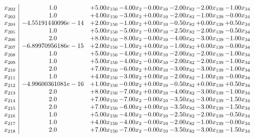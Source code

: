 \documentclass[8pt]{article}
\begin{document}
\[\begin{array}{c| c c@{\hskip 2pt} c@{\hskip 2pt} c@{\hskip 2pt} c@{\hskip 2pt} c@{\hskip 2pt} c@{\hskip 2pt} }
 x_{202}   &  1.0 & +  5.00 x_{150} & -4.00 x_{2} & -0.00 x_{10} & -2.00 x_{82} & -2.00 x_{139} & -1.00 x_{34}\\
 x_{203}   &  1.0 & +  4.00 x_{150} & -3.00 x_{2} & +  0.00 x_{10} & -2.00 x_{82} & -1.00 x_{139} & -0.00 x_{34}\\
 x_{204}   &  -4.55191440096e-14 & +  2.00 x_{150} & -1.00 x_{2} & +  0.00 x_{10} & -0.50 x_{82} & +  0.00 x_{139} & +  0.50 x_{34}\\
 x_{205}   &  1.0 & +  5.00 x_{150} & -5.00 x_{2} & -0.00 x_{10} & -2.50 x_{82} & -2.00 x_{139} & -0.50 x_{34}\\
 x_{206}   &  2.0 & +  8.00 x_{150} & -8.00 x_{2} & -0.00 x_{10} & -4.00 x_{82} & -3.00 x_{139} & -1.00 x_{34}\\
 x_{207}   &  -6.89970956186e-15 & +  2.00 x_{150} & -1.00 x_{2} & +  0.00 x_{10} & -1.00 x_{82} & +  0.00 x_{139} & -0.00 x_{34}\\
 x_{208}   &  1.0 & +  5.00 x_{150} & -4.00 x_{2} & +  0.00 x_{10} & -2.00 x_{82} & -2.00 x_{139} & -1.00 x_{34}\\
 x_{209}   &  1.0 & +  5.00 x_{150} & -4.00 x_{2} & -0.00 x_{10} & -2.00 x_{82} & -2.00 x_{139} & -1.00 x_{34}\\
 x_{210}   &  2.0 & +  7.00 x_{150} & -6.00 x_{2} & +  0.00 x_{10} & -3.00 x_{82} & -3.00 x_{139} & -1.00 x_{34}\\
 x_{211}   &  1.0 & +  4.00 x_{150} & -3.00 x_{2} & +  0.00 x_{10} & -2.00 x_{82} & -1.00 x_{139} & -0.00 x_{34}\\
 x_{212}   &  -4.99600361081e-16 & +  1.00 x_{150} & -0.00 x_{2} & +  0.00 x_{10} & -0.50 x_{82} & +  0.00 x_{139} & +  0.50 x_{34}\\
 x_{213}   &  2.0 & +  8.00 x_{150} & -7.00 x_{2} & +  0.00 x_{10} & -4.00 x_{82} & -3.00 x_{139} & -1.00 x_{34}\\
 x_{214}   &  2.0 & +  7.00 x_{150} & -7.00 x_{2} & -0.00 x_{10} & -3.50 x_{82} & -3.00 x_{139} & -1.50 x_{34}\\
 x_{215}   &  2.0 & +  7.00 x_{150} & -6.00 x_{2} & +  0.00 x_{10} & -3.50 x_{82} & -3.00 x_{139} & -1.50 x_{34}\\
 x_{216}   &  1.0 & +  5.00 x_{150} & -4.00 x_{2} & -0.00 x_{10} & -2.50 x_{82} & -2.00 x_{139} & -0.50 x_{34}\\
 x_{217}   &  1.0 & +  4.00 x_{150} & -4.00 x_{2} & -0.00 x_{10} & -2.00 x_{82} & -1.00 x_{139} & -0.00 x_{34}\\
 x_{218}   &  2.0 & +  7.00 x_{150} & -7.00 x_{2} & -0.00 x_{10} & -3.50 x_{82} & -3.00 x_{139} & -1.50 x_{34}\\

\end{array}\]
\end{document}
